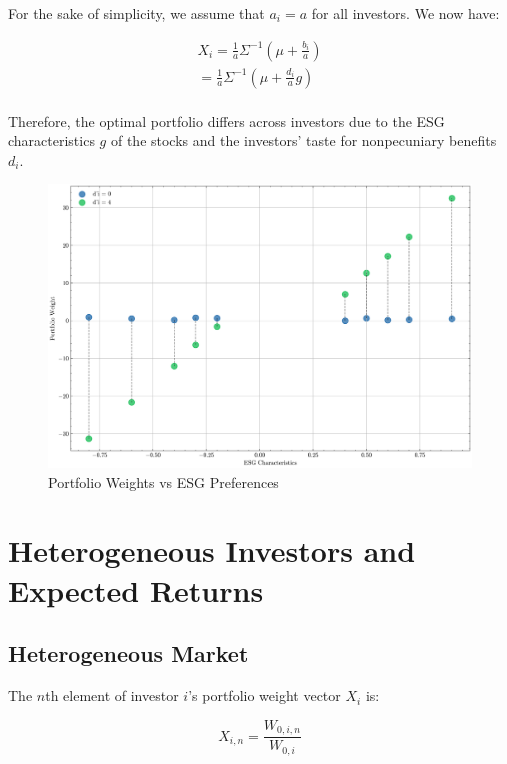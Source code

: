 For the sake of simplicity, we assume that $a_i = a$ for all investors.
We now have:

\begin{equation}
    \begin{aligned}
    X_i = \frac{1}{a} \Sigma^{-1}(\mu + \frac{b_i}{a}) \\
    = \frac{1}{a} \Sigma^{-1}(\mu + \frac{d_i}{a}g) \\
    \end{aligned}
\end{equation}

Therefore, the optimal portfolio differs across investors due to the
ESG characteristics $g$ of the stocks and the investors' taste for
nonpecuniary benefits $d_i$. 


\begin{figure}
    \centering
    \includegraphics[width=1\textwidth]{../images/chapter02/portfolio_weights_vs_esg.png}
    \caption{Portfolio Weights vs ESG Preferences}
    \label{fig:esg_taste}
\end{figure}

\newpage
\section{Heterogeneous Investors and Expected Returns}


\subsection{Heterogeneous Market}

The $n$th element of investor $i$'s portfolio weight vector $X_i$ is:

\begin{equation}
    X_{i,n} = \frac{W_{0,i,n}}{W_{0,i}}
\end{equation}

